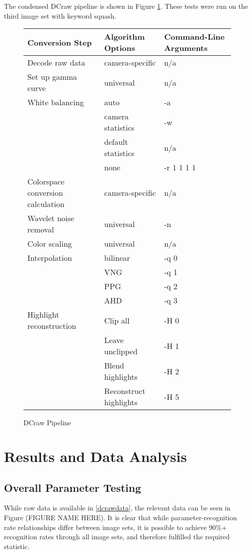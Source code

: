 \documentclass{report}
\begin{document}
		The condensed DCraw pipeline is shown in Figure \ref{condenseddcraw}. These tests were run on the third image set with keyword squash.
		
		\begin{figure}
			\begin{center}
				\label{condenseddcraw}
				\caption{DCraw Pipeline}
				\begin{tabular}{lll}
					Conversion Step & Algorithm Options & Command-Line Arguments\\
					\hline
					Decode raw data & camera-specific & n/a\\
					Set up gamma curve & universal & n/a\\
					White balancing & auto & -a\\
					& camera statistics & -w\\
					& default statistics & n/a \\
					& none & -r 1 1 1 1 \\
					Colorspace conversion calculation & camera-specific & n/a\\
					Wavelet noise removal & universal & -n \\
					Color scaling & universal & n/a \\
					Interpolation & bilinear & -q 0 \\
					& VNG & -q 1 \\
					& PPG & -q 2 \\
					& AHD & -q 3 \\
					Highlight reconstruction & Clip all & -H 0 \\
					& Leave unclipped & -H 1 \\
					& Blend highlights & -H 2 \\
					& Reconstruct highlights & -H 5 \\
				\end{tabular}
					
			\end{center}
		\end{figure}
		
	\section{Results and Data Analysis}
	\subsection{Overall Parameter Testing}
	While raw data is available in \ref{dcrawdata}, the relevant data can be seen in Figure (FIGURE NAME HERE). It is clear that while parameter-recognition rate relationships differ between image sets, it is possible to achieve 90\%+ recognition rates through all image sets, and therefore fulfilled the required statistic.
	
\end{document}
